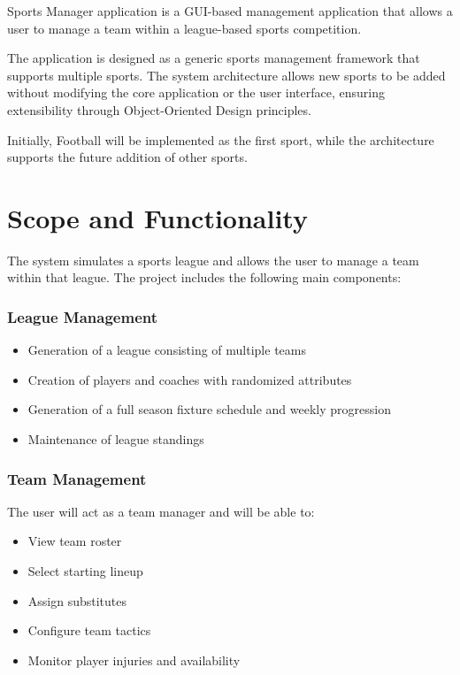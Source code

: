 \documentclass[12pt, a4paper]{article}
\begin{document}
Sports Manager application is a GUI-based management application that allows a user to
manage a team within a league-based sports competition.

The application is designed as a generic sports management framework that supports multiple
sports. The system architecture allows new sports to be added without modifying the core
application or the user interface, ensuring extensibility through Object-Oriented Design
principles.

Initially, Football will be implemented as the first sport, while the architecture supports the
future addition of other sports.

\section{Scope and Functionality}

The system simulates a sports league and allows the user to manage a team within that
league. The project includes the following main components:

\subsubsection*{League Management}
\begin{itemize}
    \item Generation of a league consisting of multiple teams
    \item Creation of players and coaches with randomized attributes
    \item Generation of a full season fixture schedule and weekly progression
    \item Maintenance of league standings
\end{itemize}

\subsubsection*{Team Management}
The user will act as a team manager and will be able to:
\begin{itemize}
    \item View team roster
    \item Select starting lineup
    \item Assign substitutes
    \item Configure team tactics
    \item Monitor player injuries and availability
\end{itemize}
\end{document}
